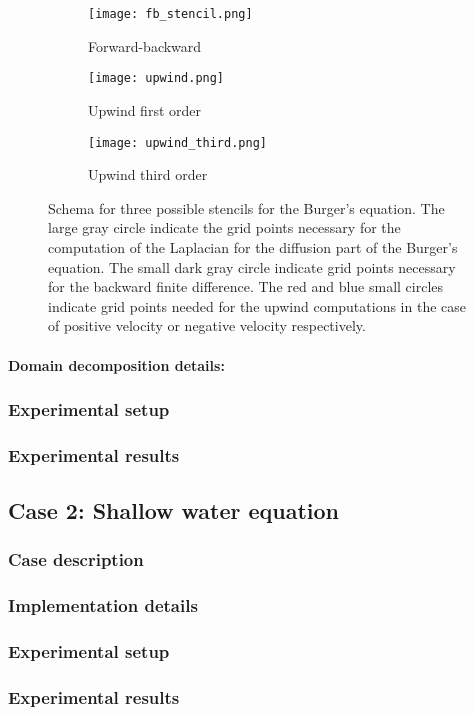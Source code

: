 \begin{figure}[!htbp]
\centering
\begin{subfigure}{.3\textwidth}
  \centering
  \texttt{[image: fb\_stencil.png]}
  \caption{Forward-backward}
  \label{fig:fb_stencil}
\end{subfigure}%
\begin{subfigure}{.3\textwidth}
  \centering
  \texttt{[image: upwind.png]}
  \caption{Upwind first order}
  \label{fig:upwind_stencil}
\end{subfigure}
\begin{subfigure}{.3\textwidth}
  \centering
  \texttt{[image: upwind\_third.png]}
  \caption{Upwind third order}
  \label{fig:upwind_third_stencil}
\end{subfigure}
\caption{Schema for three possible stencils for the Burger's equation. The large gray circle indicate the grid points necessary for the computation of the Laplacian for the diffusion part of the Burger's equation. The small dark gray circle indicate grid points necessary for the backward finite difference. The red and blue small circles indicate grid points needed for the upwind computations in the case of positive velocity or negative velocity respectively.}
\label{fig:burger_stencils}
\end{figure}

\paragraph{Domain decomposition details: }

\subsubsection{Experimental setup}

\subsubsection{Experimental results}


\subsection{Case 2: Shallow water equation}

\subsubsection{Case description}

\subsubsection{Implementation details}

\subsubsection{Experimental setup}

\subsubsection{Experimental results}
